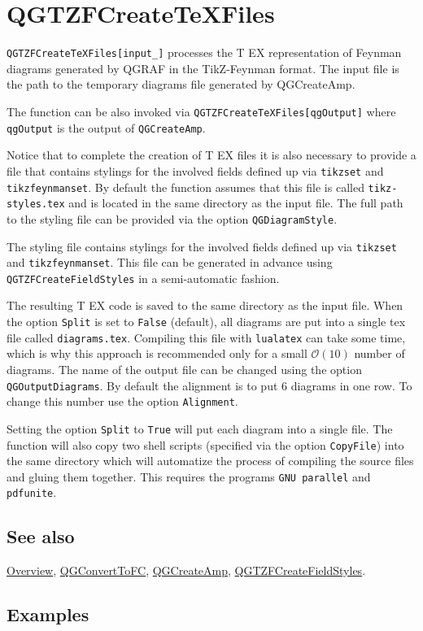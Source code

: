 \documentclass[../FeynHelpersManual.tex]{subfiles}
\begin{document}
\hypertarget{qgtzfcreatetexfiles}{
\section{QGTZFCreateTeXFiles}\label{qgtzfcreatetexfiles}}

\texttt{QGTZFCreateTeXFiles[\allowbreak{}input_]} processes the T EX
representation of Feynman diagrams generated by QGRAF in the
TikZ-Feynman format. The input file is the path to the temporary
diagrams file generated by QGCreateAmp.

The function can be also invoked via
\texttt{QGTZFCreateTeXFiles[\allowbreak{}qgOutput]} where
\texttt{qgOutput} is the output of \texttt{QGCreateAmp}.

Notice that to complete the creation of T EX files it is also necessary
to provide a file that contains stylings for the involved fields defined
up via \texttt{tikzset} and \texttt{tikzfeynmanset}. By default the
function assumes that this file is called \texttt{tikz-styles.tex} and
is located in the same directory as the input file. The full path to the
styling file can be provided via the option \texttt{QGDiagramStyle}.

The styling file contains stylings for the involved fields defined up
via \texttt{tikzset} and \texttt{tikzfeynmanset}. This file can be
generated in advance using \texttt{QGTZFCreateFieldStyles} in a
semi-automatic fashion.

The resulting T EX code is saved to the same directory as the input
file. When the option \texttt{Split} is set to \texttt{False} (default),
all diagrams are put into a single tex file called
\texttt{diagrams.tex}. Compiling this file with \texttt{lualatex} can
take some time, which is why this approach is recommended only for a
small \(\mathcal{O}(10)\) number of diagrams. The name of the output
file can be changed using the option \texttt{QGOutputDiagrams}. By
default the alignment is to put 6 diagrams in one row. To change this
number use the option \texttt{Alignment}.

Setting the option \texttt{Split} to \texttt{True} will put each diagram
into a single file. The function will also copy two shell scripts
(specified via the option \texttt{CopyFile}) into the same directory
which will automatize the process of compiling the source files and
gluing them together. This requires the programs \texttt{GNU parallel}
and \texttt{pdfunite}.

\subsection{See also}

\hyperlink{toc}{Overview}, \hyperlink{qgconverttofc}{QGConvertToFC},
\hyperlink{qgcreateamp}{QGCreateAmp},
\hyperlink{qgtzfcreatefieldstyles}{QGTZFCreateFieldStyles}.

\subsection{Examples}
\end{document}
